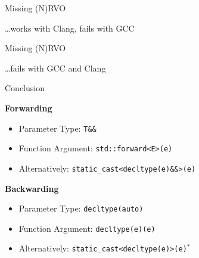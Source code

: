 \documentclass[compress,aspectratio=1610]{beamer}
\newcommand{\inputcpplisting}[1]{}
\begin{document}
\begin{frame}[fragile]{Missing (N)RVO}
    \inputcpplisting{snippet19b}

    \hfill \ldots works with Clang, fails with GCC
\end{frame}

\begin{frame}[fragile]{Missing (N)RVO}
    \inputcpplisting{snippet19c}

    \hfill \ldots fails with GCC and Clang
\end{frame}

\begin{frame}{Conclusion}
    \begin{center}
    \end{center}
    
    \textbf{Forwarding}
    \begin{itemize}
        \item Parameter Type: \texttt{T\&\&}
        \item Function Argument: \texttt{std::forward<E>(e)}
        \item Alternatively: \texttt{static\_cast<decltype(e)\&\&>(e)}
    \end{itemize}

    \textbf{Backwarding}
    \begin{itemize}
        \item Parameter Type: \texttt{decltype(auto)}
        \item Function Argument: \texttt{decltype(e)(e)}
        \item Alternatively: \texttt{static\_cast<decltype(e)>(e)}$^*$
    \end{itemize}
\end{frame}
\end{document}
